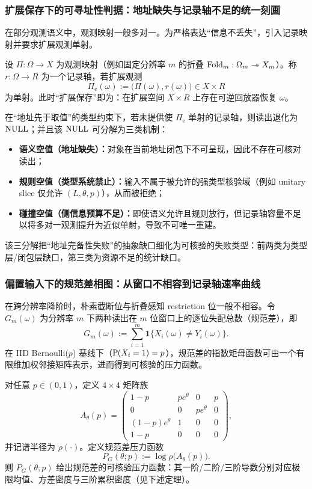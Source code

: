 \subsubsection{扩展保存下的可寻址性判据：地址缺失与记录轴不足的统一刻画}
在部分观测语义中，观测映射一般多对一。为严格表达“信息不丢失”，引入记录映射并要求扩展观测单射。
\par
设 $\Pi:\Omega\to X$ 为观测映射（例如固定分辨率 $m$ 的折叠 $\mathrm{Fold}_m:\Omega_m\twoheadrightarrow X_m$）。称 $r:\Omega\to R$ 为一个记录轴，若扩展观测
$$
\Pi_{\mathrm e}(\omega):=\bigl(\Pi(\omega),r(\omega)\bigr)\in X\times R
$$
为单射。此时“扩展保存”即为：在扩展空间 $X\times R$ 上存在可逆回放器恢复 $\omega$。
\par
在“地址先于取值”的类型约束下，若未提供使 $\Pi_{\mathrm e}$ 单射的记录轴，则读出退化为 $\mathrm{NULL}$；并且该 $\mathrm{NULL}$ 可分解为三类机制：
\begin{itemize}
  \item \textbf{语义空值（地址缺失）：}对象在当前地址闭包下不可呈现，因此不存在可核对读出；
  \item \textbf{规则空值（类型系统禁止）：}输入不属于被允许的强类型核验域（例如 unitary slice 仅允许 $(L,\theta,p)$），从而被拒绝；
  \item \textbf{碰撞空值（侧信息预算不足）：}即使语义允许且规则放行，但记录轴容量不足以将多对一观测提升为近似单射，导致不可唯一重建。
\end{itemize}
该三分解把“地址完备性失败”的抽象缺口细化为可核验的失败类型：前两类为类型层/闭包层缺口，第三类为资源不足的统计缺口。

\subsubsection{偏置输入下的规范差相图：从窗口不相容到记录轴速率曲线}
在跨分辨率降阶时，朴素截断位与折叠感知 restriction 位一般不相容。令 $G_m(\omega)$ 为分辨率 $m$ 下两种读出在 $m$ 位窗口上的逐位失配总数（规范差），即
$$
G_m(\omega):=\sum_{i=1}^{m}\mathbf{1}\{X_i(\omega)\neq Y_i(\omega)\}.
$$
在 IID Bernoulli($p$) 基线下（$\mathbb{P}(X_i=1)=p$），规范差的指数矩母函数可由一个有限维加权邻接矩阵表示，进而得到可核验的压力函数。

\begin{theorem}\label{thm:conclusion-normdiff-pressure-matrix}
对任意 $p\in(0,1)$，定义 $4\times 4$ 矩阵族
$$
A_\theta(p)=
\begin{pmatrix}
1-p & p e^{\theta} & 0 & p\\
0 & 0 & p e^{\theta} & 0\\
(1-p)e^{\theta} & 1 & 0 & 0\\
1-p & 0 & 0 & 0
\end{pmatrix},
$$
并记谱半径为 $\rho(\cdot)$。定义规范差压力函数
$$
P_G(\theta;p):=\log\rho\!\bigl(A_\theta(p)\bigr).
$$
则 $P_G(\theta;p)$ 给出规范差的可核验压力函数：其一阶/二阶/三阶导数分别对应极限均值、方差密度与三阶累积密度（见下述定理）。
\end{theorem}

